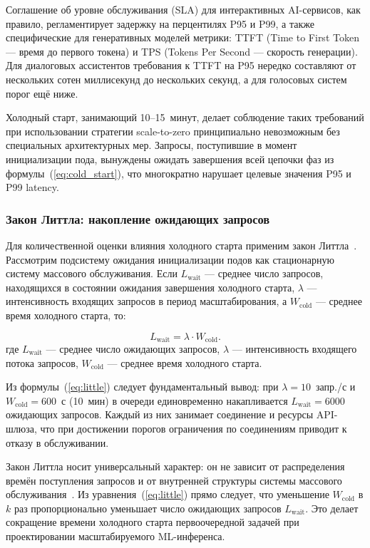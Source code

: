Соглашение об уровне обслуживания (SLA) для интерактивных AI-сервисов, как правило, регламентирует задержку на перцентилях P95 и P99, а также специфические для генеративных моделей метрики: TTFT (Time to First Token --- время до первого токена) и TPS (Tokens Per Second --- скорость генерации). Для диалоговых ассистентов требования к TTFT на P95 нередко составляют от нескольких сотен миллисекунд до нескольких секунд, а для голосовых систем порог ещё ниже.

Холодный старт, занимающий 10--15~минут, делает соблюдение таких требований при использовании стратегии scale-to-zero принципиально невозможным без специальных архитектурных мер. Запросы, поступившие в момент инициализации пода, вынуждены ожидать завершения всей цепочки фаз из формулы~(\ref{eq:cold_start}), что многократно нарушает целевые значения P95 и P99 latency.

\subsubsection{Закон Литтла: накопление ожидающих запросов}

Для количественной оценки влияния холодного старта применим закон Литтла~\cite{little1961}. Рассмотрим подсистему ожидания инициализации подов как стационарную систему массового обслуживания. Если $L_{\mathrm{wait}}$ --- среднее число запросов, находящихся в состоянии ожидания завершения холодного старта, $\lambda$ --- интенсивность входящих запросов в период масштабирования, а $W_{\mathrm{cold}}$ --- среднее время холодного старта, то:

\begin{equation}
L_{\mathrm{wait}} = \lambda \cdot W_{\mathrm{cold}}.
\label{eq:little}
\end{equation}
где $L_{\mathrm{wait}}$ --- среднее число ожидающих запросов, $\lambda$ --- интенсивность входящего потока запросов, $W_{\mathrm{cold}}$ --- среднее время холодного старта.

Из формулы~(\ref{eq:little}) следует фундаментальный вывод: при $\lambda = 10$~запр./с и $W_{\mathrm{cold}} = 600$~с (10~мин) в очереди единовременно накапливается $L_{\mathrm{wait}} = 6000$ ожидающих запросов. Каждый из них занимает соединение и ресурсы API-шлюза, что при достижении порогов ограничения по соединениям приводит к отказу в обслуживании.

Закон Литтла носит универсальный характер: он не зависит от распределения времён поступления запросов и от внутренней структуры системы массового обслуживания~\cite{little1961}. Из уравнения~(\ref{eq:little}) прямо следует, что уменьшение $W_{\mathrm{cold}}$ в $k$ раз пропорционально уменьшает число ожидающих запросов $L_{\mathrm{wait}}$. Это делает сокращение времени холодного старта первоочередной задачей при проектировании масштабируемого ML-инференса.

